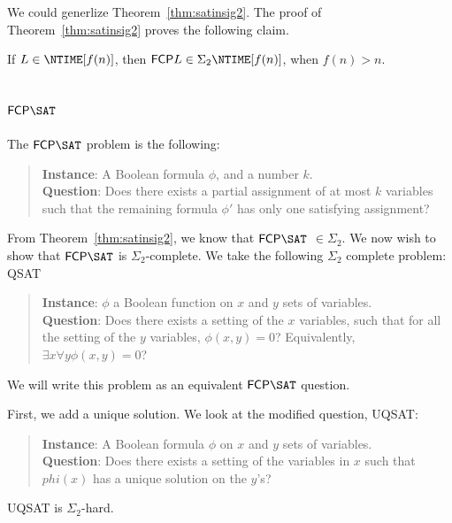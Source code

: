 \documentclass[runningheads,a4paper]{llncs}
\begin{document}
We could generlize Theorem~\ref{thm:satinsig2}. The proof of Theorem~\ref{thm:satinsig2} proves the following claim.
\begin{claim} If $L \in \NTIME[f(n)]$, then $\mathsf{FCP} L \in \Sigma_2 \NTIME[f(n)]$, when $f(n) > n$.
\end{claim}

\subsection{$\mathsf{FCP} \SAT$}

The $\mathsf{FCP} \SAT$ problem is the following:
\begin{quote}
\textbf{Instance}: A Boolean formula $\phi$, and a number $k$.\\
\textbf{Question}: Does there exists a partial assignment of at most $k$ variables such that the remaining formula $\phi'$ has only one satisfying assignment?
\end{quote}

From Theorem~\ref{thm:satinsig2}, we know that $\mathsf{FCP} \SAT$ $\in \Sigma_2$. We now wish to show that $\mathsf{FCP} \SAT$ is $\Sigma_2$-complete. We take the following $\Sigma_2$ complete problem: QSAT 
\begin{quote}
\textbf{Instance}: $\phi$ a Boolean function on $x$ and $y$ sets of variables. \\ 
\textbf{Question}: Does there exists a setting of the $x$ variables, such that for all the setting of the $y$ variables, $\phi(x,y) = 0$? Equivalently,$\exists x \forall y \phi(x,y) = 0$?
\end{quote}
We will write this problem as an equivalent $\mathsf{FCP} \SAT$ question.

First, we add a unique solution. We look at the modified question, UQSAT:
\begin{quote} 
\textbf{Instance}: A Boolean formula $\phi$ on $x$ and $y$ sets of variables. \\
\textbf{Question}: Does there exists a setting of the variables in $x$ such that $phi(x)$ has a unique solution on the $y$'s?
\end{quote}

\begin{lemma}
UQSAT is $\Sigma_2$-hard.
\end{lemma}
\end{document}
